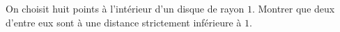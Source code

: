 On choisit huit points à l'intérieur d'un disque de rayon $1$. Montrer que deux d'entre eux sont à une distance strictement inférieure à $1$.
